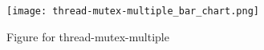 \begin{figure}[H]
\centering
\texttt{[image: thread-mutex-multiple\_bar\_chart.png]}
\caption{Figure for thread-mutex-multiple}
\end{figure}
